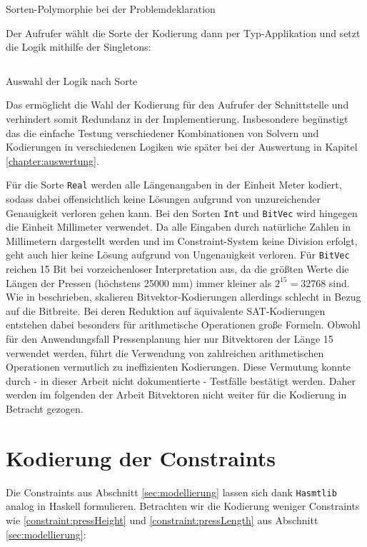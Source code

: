 \begin{listing}[H]
    \inputminted[linenos=true]{haskell}{Code/Implementierung/SortPoly.hs}
    \caption{Sorten-Polymorphie bei der Problemdeklaration}
    \label{listing:implsortpoly}
\end{listing}

Der Aufrufer wählt die Sorte der Kodierung dann per Typ-Applikation und setzt die Logik mithilfe der Singletons:

\begin{listing}[H]
    \inputminted[linenos=true]{haskell}{Code/Implementierung/SortPolySetLogic.hs}
    \caption{Auswahl der Logik nach Sorte}
    \label{listing:implsortpolylogic}
\end{listing}

Das ermöglicht die Wahl der Kodierung für den Aufrufer der Schnittstelle und verhindert somit Redundanz in der Implementierung.
Insbesondere begünstigt das die einfache Testung verschiedener Kombinationen von Solvern und Kodierungen in verschiedenen Logiken wie später bei der Auswertung in Kapitel \ref{chapter:auswertung}.

Für die Sorte \texttt{Real} werden alle Längenangaben in der Einheit Meter kodiert, sodass dabei offensichtlich keine Lösungen aufgrund von unzureichender Genauigkeit verloren gehen kann.
Bei den Sorten \texttt{Int} und \texttt{BitVec} wird hingegen die Einheit Millimeter verwendet.
Da alle Eingaben durch natürliche Zahlen in Millimetern dargestellt werden und im Constraint-System keine Division erfolgt, geht auch hier keine Lösung aufgrund von Ungenauigkeit verloren.
Für \texttt{BitVec} reichen 15 Bit bei vorzeichenloser Interpretation aus, da die größten Werte die Längen der Pressen (höchstens 25000 mm) immer kleiner als $2^{15} = 32768$ sind.
Wie in \cite{bitblasting} beschrieben, skalieren Bitvektor-Kodierungen allerdings schlecht in Bezug auf die Bitbreite.
Bei deren Reduktion auf äquivalente SAT-Kodierungen entstehen dabei besonders für arithmetische Operationen große Formeln.
Obwohl für den Anwendungsfall Pressenplanung hier nur Bitvektoren der Länge 15 verwendet werden, führt die Verwendung von zahlreichen arithmetischen Operationen
vermutlich zu ineffizienten Kodierungen.
Diese Vermutung konnte durch - in dieser Arbeit nicht dokumentierte - Testfälle bestätigt werden.
Daher werden im folgenden der Arbeit Bitvektoren nicht weiter für die Kodierung in Betracht gezogen.

\section{Kodierung der Constraints}
\label{sec:kodierungconstraints}
Die Constraints aus Abschnitt \ref{sec:modellierung} lassen sich dank \texttt{Hasmtlib} analog in Haskell formulieren.
Betrachten wir die Kodierung weniger Constraints wie \ref{constraint:pressHeight} und \ref{constraint:pressLength} aus Abschnitt \ref{sec:modellierung}:

